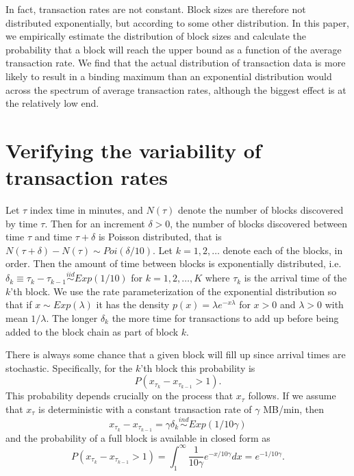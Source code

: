 \documentclass{article}
\begin{document}
In fact, transaction rates are not constant. Block sizes are therefore not distributed exponentially, but according to some other distribution. In this paper, we empirically estimate the distribution of block sizes and calculate the probability that a block will reach the upper bound as a function of the average transaction rate. We find that the actual distribution of transaction data is more likely to result in a binding maximum than an exponential distribution would across the spectrum of average transaction rates, although the biggest effect is at the relatively low end.



\section{Verifying the variability of transaction rates}
Let $\tau$ index time in minutes, and $N(\tau)$ denote the number of blocks discovered by time $\tau$. Then for an increment $\delta > 0$, the number of blocks discovered between time $\tau$ and time $\tau + \delta$ is Poisson distributed, that is $N(\tau + \delta) - N(\tau) \sim Poi(\delta/10)$. Let $k=1,2,\dots$ denote each of the blocks, in order. Then the amount of time between blocks is exponentially distributed, i.e. $\delta_k \equiv \tau_{k} - \tau_{k-1} \stackrel{iid}{\sim} Exp(1/10)$ for $k=1,2,\dots,K$ where $\tau_k$ is the arrival time of the $k$'th block. We use the rate parameterization of the exponential distribution so that if $x\sim Exp(\lambda)$ it has the density $p(x) = \lambda e^{-x\lambda}$ for $x>0$ and $\lambda>0$ with mean $1/\lambda$. The longer $\delta_k$ the more time for transactions to add up before being added to the block chain as part of block $k$.

There is always some chance that a given block will fill up since arrival times are stochastic. Specifically, for the $k$'th block this probability is
\[
P\left(x_{\tau_k} - x_{\tau_{k-1}} > 1\right).
\]
This probability depends crucially on the process that $x_\tau$ follows. If we assume that $x_{\tau}$ is deterministic with a constant transaction rate of $\gamma$ MB/min, then 
\[
x_{\tau_k} - x_{\tau_{k-1}} = \gamma\delta_k \stackrel{ind}{\sim} Exp(1/10\gamma)
\]
and the probability of a full block is available in closed form as
\[
P\left(x_{\tau_k} - x_{\tau_{k-1}} > 1\right) = \int_1^\infty \frac{1}{10\gamma}e^{-x/10\gamma}dx = e^{-1/10\gamma}.
\]
\end{document}
